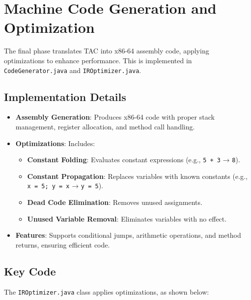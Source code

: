 \documentclass[12pt]{article}
\begin{document}
\section{Machine Code Generation and Optimization}
The final phase translates TAC into x86-64 assembly code, applying optimizations to enhance performance. This is implemented in \texttt{CodeGenerator.java} and \texttt{IROptimizer.java}.

\subsection{Implementation Details}
\begin{itemize}[itemsep=2pt]
    \item \textbf{Assembly Generation}: Produces x86-64 code with proper stack management, register allocation, and method call handling.
    \item \textbf{Optimizations}: Includes:
        \begin{itemize}
            \item \textbf{Constant Folding}: Evaluates constant expressions (e.g., \texttt{5 + 3} → \texttt{8}).
            \item \textbf{Constant Propagation}: Replaces variables with known constants (e.g., \texttt{x = 5; y = x} → \texttt{y = 5}).
            \item \textbf{Dead Code Elimination}: Removes unused assignments.
            \item \textbf{Unused Variable Removal}: Eliminates variables with no effect.
        \end{itemize}
    \item \textbf{Features}: Supports conditional jumps, arithmetic operations, and method returns, ensuring efficient code.
\end{itemize}

\subsection{Key Code}
The \texttt{IROptimizer.java} class applies optimizations, as shown below:
\end{document}
